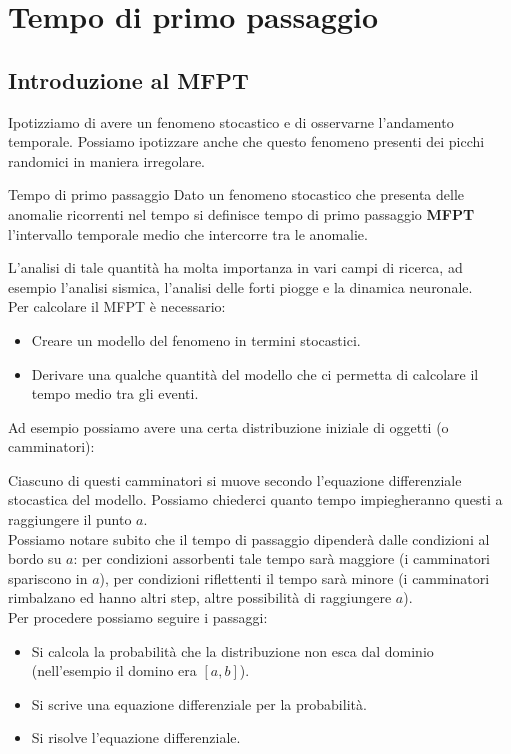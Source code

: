 \section{Tempo di primo passaggio}%
\mylocaltoc
\subsection{Introduzione al MFPT}%
\label{sub:Tempo di primo passaggio o MFPT}
Ipotizziamo di avere un fenomeno stocastico e di osservarne l'andamento temporale. Possiamo ipotizzare anche che questo fenomeno presenti dei picchi randomici in maniera irregolare. \\
\begin{redbox}{Tempo di primo passaggio}
    Dato un fenomeno stocastico che presenta delle anomalie ricorrenti nel tempo si definisce tempo di primo passaggio \textbf{MFPT} l'intervallo temporale medio che intercorre tra le anomalie.
\end{redbox}
\noindent
L'analisi di tale quantità ha molta importanza in vari campi di ricerca, ad esempio l'analisi sismica, l'analisi delle forti piogge e la dinamica neuronale.\\
Per calcolare il MFPT è necessario:
\begin{itemize}
    \item Creare un modello del fenomeno in termini stocastici.
    \item Derivare una qualche quantità del modello che ci permetta di calcolare il tempo medio tra gli eventi.
\end{itemize}
Ad esempio possiamo avere una certa distribuzione iniziale di oggetti (o camminatori):

\noindent
Ciascuno di questi camminatori si muove secondo l'equazione differenziale stocastica del modello. Possiamo chiederci quanto tempo impiegheranno questi a raggiungere il punto $a$. \\
Possiamo notare subito che il tempo di passaggio dipenderà dalle condizioni al bordo su $a$: per condizioni assorbenti tale tempo sarà maggiore (i camminatori spariscono in $a$), per condizioni riflettenti il tempo sarà minore (i camminatori rimbalzano ed hanno altri step, altre possibilità di raggiungere $a$).\\
Per procedere possiamo seguire i passaggi:
\begin{itemize}
    \item Si calcola la probabilità che la distribuzione non esca dal dominio (nell'esempio il domino era $[a,b]$).
    \item Si scrive una equazione differenziale per la probabilità.
    \item Si risolve l'equazione differenziale.
\end{itemize}
